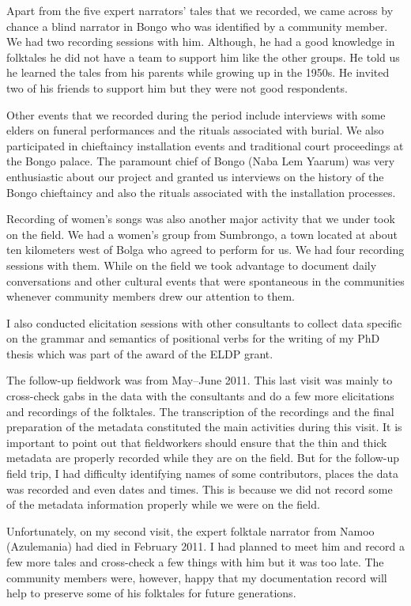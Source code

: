 \documentclass[output=paper,colorlinks,citecolor=brown]{langscibook}
\begin{document}
Apart from the five expert narrators’ tales that we recorded, we came across by chance a blind narrator in Bongo who was identified by a community member. We had two recording sessions with him. Although, he had a good knowledge in folktales he did not have a team to support him like the other groups. He told us he learned the tales from his parents while growing up in the 1950s. He invited two of his friends to support him but they were not good respondents.

Other events that we recorded during the period include interviews with some elders on funeral performances and the rituals associated with burial. We also participated in chieftaincy installation events and traditional court proceedings at the Bongo palace. The paramount chief of Bongo (Naba Lem Yaarum) was very enthusiastic about our project and granted us interviews on the history of the Bongo chieftaincy and also the rituals associated with the installation processes. 

Recording of women’s songs was also another major activity that we under took on the field. We had a women’s group from Sumbrongo, a town located at about ten kilometers west of Bolga who agreed to perform for us. We had four recording sessions with them. While on the field we took advantage to document daily conversations and other cultural events that were spontaneous in the communities whenever community members drew our attention to them.

I also conducted elicitation sessions with other consultants to collect data specific on the grammar and semantics of positional verbs for the writing of my PhD thesis which was part of the award of the ELDP grant. 

The follow-up fieldwork was from May–June 2011. This last visit was mainly to cross-check gabs in the data with the consultants and do a few more elicitations and recordings of the folktales. The transcription of the recordings and the final preparation of the metadata constituted the main activities during this visit. It is important to point out that fieldworkers should ensure that the thin and thick metadata are properly recorded while they are on the field. But for the follow-up field trip, I had difficulty identifying names of some contributors, places the data was recorded and even dates and times. This is because we did not record some of the metadata information properly while we were on the field.

Unfortunately, on my second visit, the expert folktale narrator from Namoo (Azulemania) had died in February 2011. I had planned to meet him and record a few more tales and cross-check a few things with him but it was too late. The community members were, however, happy that my documentation record will help to preserve some of his folktales for future generations.
\end{document}
